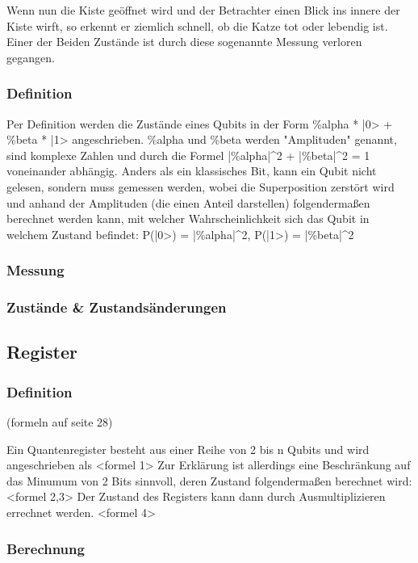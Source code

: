 Wenn nun die Kiste geöffnet wird und der Betrachter einen Blick ins innere der Kiste wirft, so erkennt er ziemlich schnell, ob die Katze tot oder lebendig ist. Einer der Beiden Zustände ist durch diese sogenannte Messung verloren gegangen.

\subsubsection{Definition}

Per Definition werden die Zustände eines Qubits in der Form \%alpha * |0> + \%beta * |1> angeschrieben.
\%alpha und \%beta werden "Amplituden" genannt, sind komplexe Zahlen und durch die Formel |\%alpha|^2 + |\%beta|^2 = 1 voneinander abhängig.
Anders als ein klassisches Bit, kann ein Qubit nicht gelesen, sondern muss gemessen werden, wobei die Superposition zerstört wird und anhand der Amplituden (die einen Anteil darstellen) folgendermaßen berechnet werden kann, mit welcher Wahrscheinlichkeit sich das Qubit in welchem Zustand befindet: P(|0>) = |\%alpha|^2, P(|1>) = |\%beta|^2

\subsubsection{Messung}

\subsubsection{Zust\"ande & Zustands\"anderungen}

\subsection{Register}
\label{sec:Register}

\subsubsection{Definition}
(formeln auf seite 28)

Ein Quantenregister besteht aus einer Reihe von 2 bis n Qubits und wird angeschrieben als <formel 1>
Zur Erklärung ist allerdings eine Beschränkung auf das Minumum von 2 Bits sinnvoll, deren Zustand folgendermaßen berechnet wird: <formel 2,3>
Der Zustand des Registers kann dann durch Ausmultiplizieren errechnet werden. <formel 4>

\subsubsection{Berechnung}


